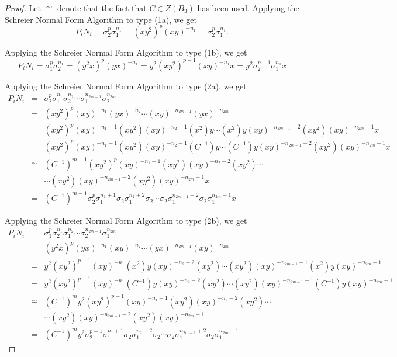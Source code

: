 \documentclass{article}
\begin{document}
\begin{proof} Let $\cong$ denote that the fact that $C \in Z(B_{3})$ has been used. Applying the Schreier Normal Form Algorithm to type (1a), we get 
$$P_{i}N_{i} = \sigma_{2}^{p}\sigma_{1}^{n_{1}} = (xy^{2})^{p}(xy)^{-n_{1}} = \sigma_{2}^{p}\sigma_{1}^{n_{1}}.$$

\noindent Applying the Schreier Normal Form Algorithm to type (1b), we get 
$$P_{i}N_{i} = \sigma_{1}^{p}\sigma_{2}^{n_{1}} = (y^{2}x)^{p}(yx)^{-n_{1}} = y^{2}(xy^{2})^{p-1}(xy)^{-n_{1}}x = y^{2}\sigma_{2}^{p-1}\sigma_{1}^{n_{1}}x$$

\noindent Applying the Schreier Normal Form Algorithm to type (2a), we get  
\begin{eqnarray*}
P_{i}N_{i} & = & \sigma_{2}^{p}\sigma_{1}^{n_{1}}\sigma_{2}^{n_{2}}\cdots\sigma_{1}^{n_{2m-1}}\sigma_{2}^{n_{2m}}\\
\ & = & (xy^{2})^{p}(xy)^{-n_{1}}(yx)^{-n_{2}} \cdots (xy)^{-n_{2m-1}}(yx)^{-n_{2m}}\\
\ & = & (xy^{2})^{p}(xy)^{-n_{1}-1}(xy^{2})(xy)^{-n_{2}-1}(x^{2})y \cdots(x^{2})y(xy)^{-n_{2m-1}-2}(xy^{2})(xy)^{-n_{2m}-1}x\\
\ & = & (xy^{2})^{p}(xy)^{-n_{1}-1}(xy^{2})(xy)^{-n_{2}-1}(C^{-1})y \cdots(C^{-1})y(xy)^{-n_{2m-1}-2}(xy^{2})(xy)^{-n_{2m}-1}x\\
\ & \cong & (C^{-1})^{m-1}(xy^{2})^{p}(xy)^{-n_{1}-1}(xy^{2})(xy)^{-n_{2}-2}(xy^{2}) \cdots\\
\ & \ & \cdots(xy^{2})(xy)^{-n_{2m-1}-2}(xy^{2})(xy)^{-n_{2m}-1}x\\
\ & = & (C^{-1})^{m-1}\sigma_{2}^{p}\sigma_{1}^{n_{1}+1}\sigma_{2}\sigma_{1}^{n_{2}+2}\sigma_{2} \cdots \sigma_{2}\sigma_{1}^{n_{2m-1}+2}\sigma_{2}\sigma_{1}^{n_{2m}+1}x
\end{eqnarray*}

\noindent Applying the Schreier Normal Form Algorithm to type (2b), we get 
\begin{eqnarray*}
P_{i}N_{i} & = & \sigma_{1}^{p}\sigma_{2}^{n_{1}}\sigma_{1}^{n_{2}}\cdots\sigma_{2}^{n_{2m-1}}\sigma_{1}^{n_{2m}}\\
\ & = & (y^{2}x)^{p}(yx)^{-n_{1}}(xy)^{-n_{2}} \cdots (yx)^{-n_{2m-1}}(xy)^{-n_{2m}}\\
\ & = & y^{2}(xy^{2})^{p-1}(xy)^{-n_{1}}(x^{2})y(xy)^{-n_{2}-2}(xy^{2}) \cdots(xy^{2})(xy)^{-n_{2m-1}-1}(x^{2})y(xy)^{-n_{2m}-1}\\
\ & = & y^{2}(xy^{2})^{p-1}(xy)^{-n_{1}}(C^{-1})y(xy)^{-n_{2}-2}(xy^{2}) \cdots(xy^{2})(xy)^{-n_{2m-1}-1}(C^{-1})y(xy)^{-n_{2m}-1}\\
\ & \cong & (C^{-1})^{m}y^{2}(xy^{2})^{p-1}(xy)^{-n_{1}-1}(xy^{2})(xy)^{-n_{2}-2}(xy^{2}) \cdots\\
\ & \ & \cdots(xy^{2})(xy)^{-n_{2m-1}-2}(xy^{2})(xy)^{-n_{2m}-1}\\
\ & = & (C^{-1})^{m}y^{2}\sigma_{2}^{p-1}\sigma_{1}^{n_{1}+1}\sigma_{2}\sigma_{1}^{n_{2}+2}\sigma_{2} \cdots \sigma_{2}\sigma_{1}^{n_{2m-1}+2}\sigma_{2}\sigma_{1}^{n_{2m}+1}
\end{eqnarray*}


\end{proof}
\end{document}
